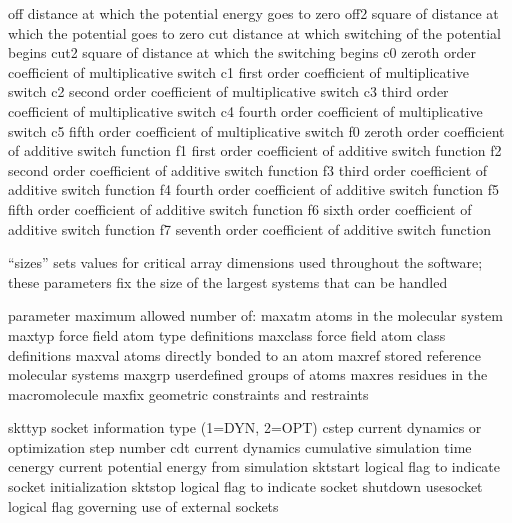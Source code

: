 \documentclass[letterpaper,11pt,english]{sphinxmanual}
\begin{document}
\begin{sphinxVerbatim}[commandchars=\\\{\}]
off             distance at which the potential energy goes to zero
off2            square of distance at which the potential goes to zero
cut             distance at which switching of the potential begins
cut2            square of distance at which the switching begins
c0              zeroth order coefficient of multiplicative switch
c1              first order coefficient of multiplicative switch
c2              second order coefficient of multiplicative switch
c3              third order coefficient of multiplicative switch
c4              fourth order coefficient of multiplicative switch
c5              fifth order coefficient of multiplicative switch
f0              zeroth order coefficient of additive switch function
f1              first order coefficient of additive switch function
f2              second order coefficient of additive switch function
f3              third order coefficient of additive switch function
f4              fourth order coefficient of additive switch function
f5              fifth order coefficient of additive switch function
f6              sixth order coefficient of additive switch function
f7              seventh order coefficient of additive switch function
\end{sphinxVerbatim}


“sizes” sets values for critical array dimensions used
throughout the software; these parameters fix the size of
the largest systems that can be handled

\begin{sphinxVerbatim}[commandchars=\\\{\}]
parameter       maximum allowed number of:
maxatm          atoms in the molecular system
maxtyp          force field atom type definitions
maxclass        force field atom class definitions
maxval          atoms directly bonded to an atom
maxref          stored reference molecular systems
maxgrp          user\PYGZhy{}defined groups of atoms
maxres          residues in the macromolecule
maxfix          geometric constraints and restraints
\end{sphinxVerbatim}


\begin{sphinxVerbatim}[commandchars=\\\{\}]
skttyp          socket information type (1=DYN, 2=OPT)
cstep           current dynamics or optimization step number
cdt             current dynamics cumulative simulation time
cenergy         current potential energy from simulation
sktstart        logical flag to indicate socket initialization
sktstop         logical flag to indicate socket shutdown
use\PYGZus{}socket      logical flag governing use of external sockets
\end{sphinxVerbatim}
\end{document}
